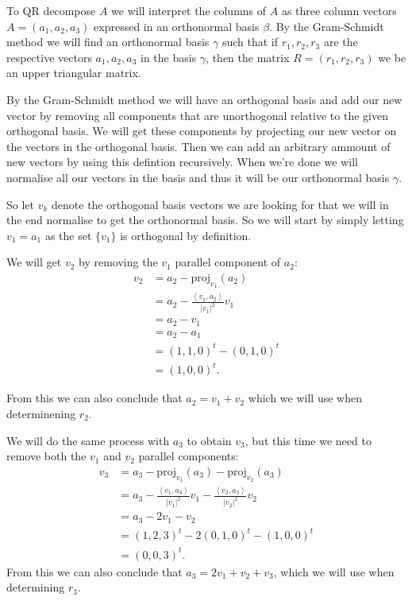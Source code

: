 \documentclass[10pt]{article}
\begin{document}
\begin{solution}[1]  \label{sol:1}
To QR decompose \(A\) we will interpret the columns of \(A\)
as three column vectors \(A = ( a_1 , a_2, a_3)\) expressed in an orthonormal
basis \(\beta\). By the Gram-Schmidt method we will find an orthonormal
basis  
\(\gamma\) such that if \(r_1, r_2 , r_3\) are the respective vectors \(a_1, a_2 , a_3\)
in the basis \(\gamma\), then the matrix \(R = (r_1, r_2, r_3)\) we be an upper
triangular matrix.

By the Gram-Schmidt method we will have an orthogonal basis and add our
new vector by removing all components that are unorthogonal relative to
the given orthogonal basis. We will get these components by projecting
our new vector on the vectors in the orthogonal basis. Then we can add
an arbitrary ammount of new vectors by using this defintion recursively.
When we're done we will normalise all our vectors in the basis and thus
it will be our orthonormal basis \(\gamma\).

So let \(v_k\) denote the orthogonal basis vectors we are looking for
that we will in the end normalise to get the orthonormal basis.
So we will start by simply letting \(v_1 = a_1\) as the set
\(\{ v_1 \}\) is orthogonal by definition.

We will get \(v_2\) by removing the \(v_1\) parallel component of \(a_2\):
\begin{align*}
v_2  &  = a_2 - \text{proj} _{v_1} (a_2) \\
& = a_2 - \frac{\left< v_1, a_2 \right> }{|v_1| ^2} v_1 \\
& = a_2 - v_1 \\
& = a_2 - a_1 \\
& = (1,1,0)^{t} - (0,1,0)^{t} \\
& = (1,0,0)^{t} 
.
\end{align*}

From this we can also conclude that \(a_2 = v_1 + v_2\) which we will
use when determinening \(r_2\).


We will do the same process with \(a_3\) to obtain \(v_3\), but this
time we need to remove both the \(v_1\) and \(v_2\) parallel components:
\begin{align*}
v_3  &  = a_3 - \text{proj} _{v_1}(a_3) - \text{proj} _{v_2}(a_3) \\
& = a_3 - \frac{\left< v_1, a_3 \right> }{| v_1 | ^2} v_1
- \frac{\left< v_2, a_3 \right> }{| v_2 | ^2} v_2 \\
& = a_3 - 2v_1 - v_2 \\
& = (1,2,3)^{t} - 2(0,1,0)^{t} - (1,0,0)^{t} \\
& = (0,0,3)^{t} 
.
\end{align*}
From this we can also conclude that \(a_3 = 2v_1 + v_2 + v_3\), which we will
use when determining \(r_3\).


\end{solution}
\end{document}
